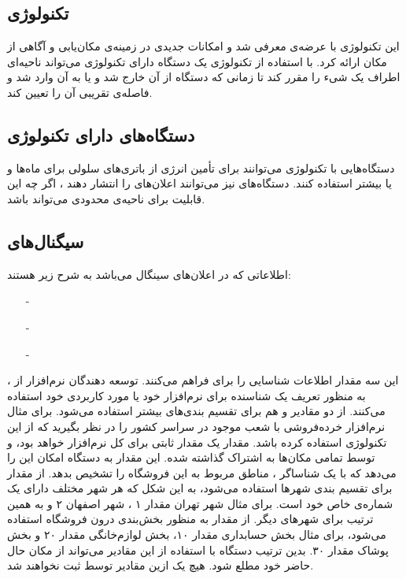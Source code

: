 \documentclass[oneside]{report}
\begin{document}
\subsection{ تکنولوژی{\normalsize {}} }
این تکنولوژی با عرضه‌ی 
	 		{\normalsize {}} 
معرفی شد و امکانات جدیدی در زمینه‌ی مکان‌یابی و آگاهی از مکان ارائه کرد. با استفاده از تکنولوژی 
	 		{\normalsize {}} 
یک دستگاه دارای تکنولوژی
	 		{\normalsize {}}
	می‌تواند ناحیه‌ای اطراف یک شیء را مقرر کند تا زمانی که دستگاه 
		 		{\normalsize {}}
	از آن خارج شد و یا به آن وارد شد و فاصله‌ی تقریبی آن را تعیین کند. 
	
	 \subsection{ دستگاه‌های دارای تکنولوژی{\normalsize {}} } 
دستگاه‌هایی با تکنولوژی 
	 		{\normalsize {}}
	 		می‌توانند برای تأمین انرژی از باتری‌های سلولی برای ماه‌ها و یا بیشتر استفاده کنند. دستگاه‌های 
	 			 		{\normalsize {}} 
	 			 		نیز می‌توانند اعلان‌های 
	 			 			 		{\normalsize {}}
	 			 			 		را انتشار دهند ، اگر چه این قابلیت برای ناحیه‌ی محدودی می‌تواند باشد. 
	 			 			 		
	\subsection{سیگنال‌های {\normalsize {}}} 			 			 		
	اطلاعاتی که در اعلان‌های سینگال 
		 		{\normalsize {}}
		 		می‌باشد به شرح زیر هستند:  			 			 		
	\begin{itemize}
		\item[-] 	{\normalsize {}}
		\item[-] 	{\normalsize {}}
		\item[-]	{\normalsize {}}
	\end{itemize}
 این سه مقدار اطلاعات شناسایی را برای 
 		 		{\normalsize {}}
 		 		فراهم می‌کنند.  توسعه دهندگان نرم‌افزار از 
 		 				 		{\normalsize {}}
، به منظور تعریف یک شناسنده برای نرم‌افزار خود یا مورد کاربردی خود استفاده می‌کنند. 
از دو مقادیر 
		 		{\normalsize {}}
		 		و 
		 				 		{\normalsize {}}
		 				 		هم برای تقسیم بندی‌های بیشتر استفاده می‌شود. برای مثال نرم‌افزار خرده‌فروشی  با شعب موجود در سراسر کشور را در نظر بگیرید که از این تکنولوژی استفاده کرده باشد. مقدار 
		 				 		{\normalsize {}}
یک مقدار ثابتی برای کل نرم‌افزار خواهد بود، و توسط تمامی مکان‌ها به اشتراک گذاشته شده. این مقدار به دستگاه 
{\normalsize {}}
امکان این را می‌دهد که با یک شناساگر ، مناطق مربوط به این فروشگاه را تشخیص بدهد. از مقدار 
{\normalsize {}}
برای تقسیم بندی شهر‌ها استفاده می‌شود، به این شکل که هر شهر مختلف دارای یک شماره‌ی 
{\normalsize {}}
خاص خود است. برای مثال شهر تهران مقدار ۱ ، شهر اصفهان ۲ و به همین ترتیب برای شهر‌های دیگر. از مقدار 
{\normalsize {}}
به منظور بخش‌بندی درون فروشگاه استفاده می‌شود، برای مثال بخش حسابداری مقدار ۱۰، بخش لوازم‌خانگی مقدار ۲۰ و بخش پوشاک مقدار ۳۰. بدین ترتیب دستگاه 
{\normalsize {}}
با استفاده از این مقادیر می‌تواند از مکان حال حاضر خود مطلع شود.	هیچ یک ازین مقادیر توسط 
{\normalsize {}}
ثبت نخواهند شد.				
\end{document}
